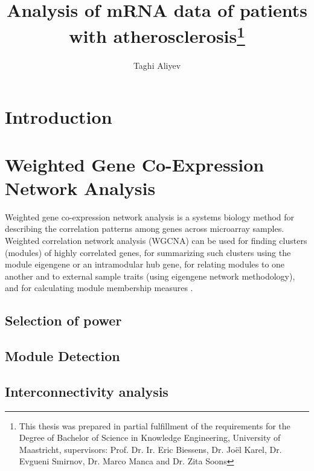 \documentclass{ba-kecs}
\numberwithin{figure}{section}
\numberwithin{equation}{section}
\begin{document}
\title{Analysis of mRNA data of patients with atherosclerosis\footnote{This thesis was prepared in partial fulfillment of the requirements
 for the Degree of Bachelor of Science in Knowledge Engineering,
University of Maastricht,  supervisors: Prof. Dr. Ir. Eric Biessens, Dr. Jo\"{e}l Karel, Dr. Evgueni Smirnov, Dr. Marco Manca and Dr. Zita Soons}}
\author{Taghi Aliyev \\}
\maketitle



\begin{abstract}


\end{abstract}


\section{Introduction}

\section{Weighted Gene Co-Expression Network Analysis}
Weighted gene co-expression network analysis is a systems biology method for describing the correlation patterns among genes across microarray samples. Weighted correlation network analysis (WGCNA) can be used for finding clusters (modules) of highly correlated genes, for summarizing such clusters using the module eigengene or an intramodular hub gene, for relating modules to one another and to external sample traits (using eigengene network methodology), and for calculating module membership measures \cite{wgcna}.
\subsection{Selection of power}
\subsection{Module Detection}
\subsection{Interconnectivity analysis}
\end{document}
